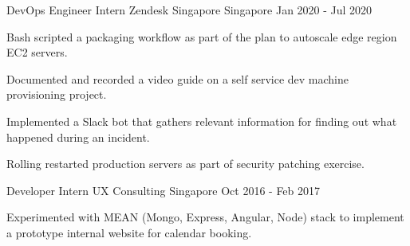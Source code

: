 

\begin{cventries}

  \cventry
    {DevOps Engineer Intern} %
    {Zendesk Singapore} %
    {Singapore} %
    {Jan 2020 - Jul 2020} %
    {
      \begin{cvitems} %
        \item {Bash scripted a packaging workflow as part of the plan to autoscale edge region EC2 servers.}
        \item {Documented and recorded a video guide on a self service dev machine provisioning project.}
        \item {Implemented a Slack bot that gathers relevant information for finding out what happened during an incident.}
        \item {Rolling restarted production servers as part of security patching exercise.}
      \end{cvitems}
    }

  \cventry
    {Developer Intern} %
    {UX Consulting} %
    {Singapore} %
    {Oct 2016 - Feb 2017} %
    {
      \begin{cvitems} %
        \item {Experimented with MEAN (Mongo, Express, Angular, Node) stack to implement a prototype internal website for calendar booking.}
      \end{cvitems}
    }

\end{cventries}
